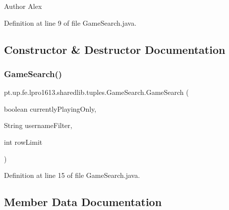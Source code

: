 \begin{DoxyAuthor}{Author}
Alex 
\end{DoxyAuthor}


Definition at line 9 of file Game\+Search.\+java.



\subsection{Constructor \& Destructor Documentation}
\hypertarget{classpt_1_1up_1_1fe_1_1lpro1613_1_1sharedlib_1_1tuples_1_1_game_search_a471ebce85644752f9f34d86d69ed59c8}{}\label{classpt_1_1up_1_1fe_1_1lpro1613_1_1sharedlib_1_1tuples_1_1_game_search_a471ebce85644752f9f34d86d69ed59c8} 
\subsubsection{\texorpdfstring{Game\+Search()}{GameSearch()}}
{\footnotesize\ttfamily pt.\+up.\+fe.\+lpro1613.\+sharedlib.\+tuples.\+Game\+Search.\+Game\+Search (\begin{DoxyParamCaption}\item[{boolean}]{currently\+Playing\+Only,  }\item[{String}]{username\+Filter,  }\item[{int}]{row\+Limit }\end{DoxyParamCaption})}



Definition at line 15 of file Game\+Search.\+java.



\subsection{Member Data Documentation}
\hypertarget{classpt_1_1up_1_1fe_1_1lpro1613_1_1sharedlib_1_1tuples_1_1_game_search_a0a5922980b753f849b7a22cc8998034f}{}\label{classpt_1_1up_1_1fe_1_1lpro1613_1_1sharedlib_1_1tuples_1_1_game_search_a0a5922980b753f849b7a22cc8998034f} 
